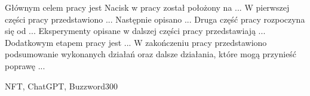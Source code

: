 \cleardoublepage %
\streszczenie

Głównym celem pracy jest
Nacisk w pracy został położony na ...
W pierwszej części pracy przedstawiono ...
Następnie opisano ...
Druga część pracy rozpoczyna się od ...
Eksperymenty opisane w dalszej części pracy przedstawiają ...
Dodatkowym etapem pracy jest ...
W zakończeniu pracy przedstawiono podsumowanie wykonanych działań
oraz dalsze działania, które mogą przynieść poprawę ...

\slowakluczowe NFT, ChatGPT, Buzzword300


